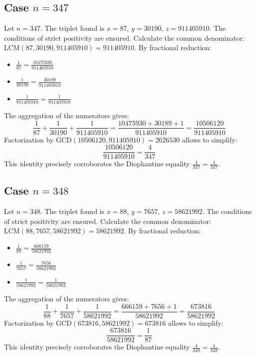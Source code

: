 \documentclass[11pt,a4paper]{article}
\begin{document}
\subsection{Case $n = 347$}
Let $n = 347$. The triplet found is $x = 87$, $y = 30190$, $z = 911405910$.
The conditions of strict positivity are ensured.
Calculate the common denominator: $\text{LCM}(87, 30190, 911405910) = 911405910$.
By fractional reduction:
\begin{itemize}
    \item $\frac{1}{87} = \frac{10475930}{911405910}$
    \item $\frac{1}{30190} = \frac{30189}{911405910}$
    \item $\frac{1}{911405910} = \frac{1}{911405910}$
\end{itemize}
The aggregation of the numerators gives:
$$ \frac{1}{87} + \frac{1}{30190} + \frac{1}{911405910} = \frac{10475930 + 30189 + 1}{911405910} = \frac{10506120}{911405910} $$
Factorization by $\text{GCD}(10506120, 911405910) = 2626530$ allows to simplify:
$$ \frac{10506120}{911405910} = \frac{4}{347} $$
This identity precisely corroborates the Diophantine equality $\frac{4}{347} = \frac{4}{347}$.

\subsection{Case $n = 348$}
Let $n = 348$. The triplet found is $x = 88$, $y = 7657$, $z = 58621992$.
The conditions of strict positivity are ensured.
Calculate the common denominator: $\text{LCM}(88, 7657, 58621992) = 58621992$.
By fractional reduction:
\begin{itemize}
    \item $\frac{1}{88} = \frac{666159}{58621992}$
    \item $\frac{1}{7657} = \frac{7656}{58621992}$
    \item $\frac{1}{58621992} = \frac{1}{58621992}$
\end{itemize}
The aggregation of the numerators gives:
$$ \frac{1}{88} + \frac{1}{7657} + \frac{1}{58621992} = \frac{666159 + 7656 + 1}{58621992} = \frac{673816}{58621992} $$
Factorization by $\text{GCD}(673816, 58621992) = 673816$ allows to simplify:
$$ \frac{673816}{58621992} = \frac{1}{87} $$
This identity precisely corroborates the Diophantine equality $\frac{4}{348} = \frac{4}{348}$.
\end{document}
